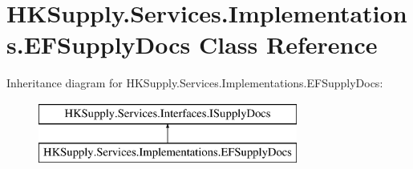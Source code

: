 \hypertarget{class_h_k_supply_1_1_services_1_1_implementations_1_1_e_f_supply_docs}{}\section{H\+K\+Supply.\+Services.\+Implementations.\+E\+F\+Supply\+Docs Class Reference}
\label{class_h_k_supply_1_1_services_1_1_implementations_1_1_e_f_supply_docs}
Inheritance diagram for H\+K\+Supply.\+Services.\+Implementations.\+E\+F\+Supply\+Docs\+:\begin{figure}[H]
\begin{center}
\leavevmode
\includegraphics[height=2.000000cm]{class_h_k_supply_1_1_services_1_1_implementations_1_1_e_f_supply_docs}
\end{center}
\end{figure}
